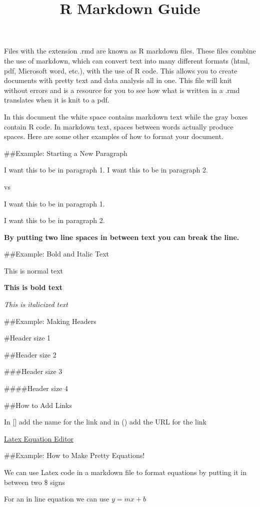 \documentclass[
]{article}
\title{R Markdown Guide}
\author{}
\date{\vspace{-2.5em}}
\begin{document}
\maketitle

Files with the extension .rmd are known as R markdown files. These files
combine the use of markdown, which can convert text into many different
formats (html, pdf, Microsoft word, etc.), with the use of R code. This
allows you to create documents with pretty text and data analysis all in
one. This file will knit without errors and is a resource for you to see
how what is written in a .rmd translates when it is knit to a pdf.

In this document the white space contains markdown text while the gray
boxes contain R code. In markdown text, spaces between words actually
produce spaces. Here are some other examples of how to format your
document.

\#\#Example: Starting a New Paragraph

I want this to be in paragraph 1. I want this to be in paragraph 2.

vs

I want this to be in paragraph 1.

I want this to be in paragraph 2.

\textbf{By putting two line spaces in between text you can break the
line.}

\#\#Example: Bold and Italic Text

This is normal text

\textbf{This is bold text}

\emph{This is italicized text}

\#\#Example: Making Headers

\#Header size 1

\#\#Header size 2

\#\#\#Header size 3

\#\#\#\#Header size 4

\#\#How to Add Links

In {[}{]} add the name for the link and in () add the URL for the link

\href{https://www.codecogs.com/latex/eqneditor.php}{Latex Equation
Editor}

\#\#Example: How to Make Pretty Equations!

We can use Latex code in a markdown file to format equations by putting
it in between two \$ signs

For an in line equation we can use \(y = mx + b\)
\end{document}

